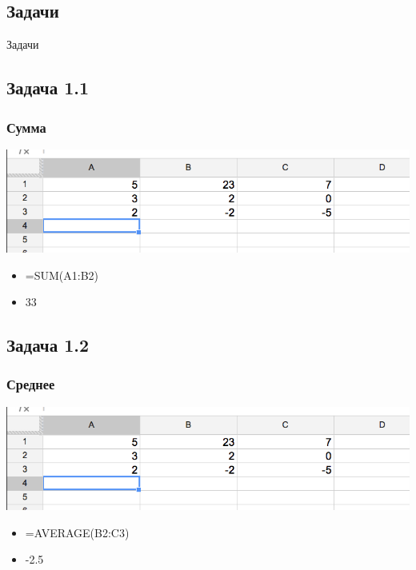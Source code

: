 \documentclass[compress,red]{beamer}
\begin{document}
\subsection{Задачи}
\begin{frame}
  \begin{center}
    \Huge{Задачи}
  \end{center}
\end{frame}


\subsection{Задача 1.1}
\begin{frame}[fragile]
  \frametitle{Сумма}
  \centerline{\includegraphics[width=1.0\textwidth]{images/11.png}}
  \begin{itemize}[<+->]
      \item =SUM(A1:B2)
      \item 33
  \end{itemize}
\end{frame}

\subsection{Задача 1.2}
\begin{frame}[fragile]
  \frametitle{Среднее}
  \centerline{\includegraphics[width=1.0\textwidth]{images/11.png}}
  \begin{itemize}[<+->]
      \item =AVERAGE(B2:C3)
      \item -2.5
  \end{itemize}
\end{frame}
\end{document}
